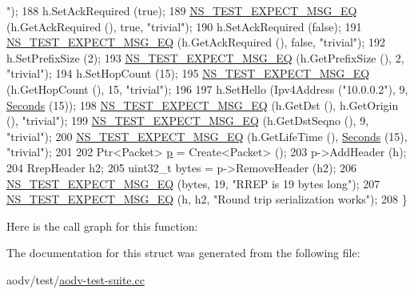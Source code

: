 \begin{DoxyCode}
{      "});
188     h.SetAckRequired (\textcolor{keyword}{true});
189     \hyperlink{group__testing_ga7304ba46a28d8cf08dfdfd6499cf7068}{NS\_TEST\_EXPECT\_MSG\_EQ} (h.GetAckRequired (), \textcolor{keyword}{true}, \textcolor{stringliteral}{"trivial"});
190     h.SetAckRequired (\textcolor{keyword}{false});
191     \hyperlink{group__testing_ga7304ba46a28d8cf08dfdfd6499cf7068}{NS\_TEST\_EXPECT\_MSG\_EQ} (h.GetAckRequired (), \textcolor{keyword}{false}, \textcolor{stringliteral}{"trivial"});
192     h.SetPrefixSize (2);
193     \hyperlink{group__testing_ga7304ba46a28d8cf08dfdfd6499cf7068}{NS\_TEST\_EXPECT\_MSG\_EQ} (h.GetPrefixSize (), 2, \textcolor{stringliteral}{"trivial"});
194     h.SetHopCount (15);
195     \hyperlink{group__testing_ga7304ba46a28d8cf08dfdfd6499cf7068}{NS\_TEST\_EXPECT\_MSG\_EQ} (h.GetHopCount (), 15, \textcolor{stringliteral}{"trivial"});
196 
197     h.SetHello (Ipv4Address (\textcolor{stringliteral}{"10.0.0.2"}), 9, \hyperlink{group__timecivil_ga33c34b816f8ff6628e33d5c8e9713b9e}{Seconds} (15));
198     \hyperlink{group__testing_ga7304ba46a28d8cf08dfdfd6499cf7068}{NS\_TEST\_EXPECT\_MSG\_EQ} (h.GetDst (), h.GetOrigin (), \textcolor{stringliteral}{"trivial"});
199     \hyperlink{group__testing_ga7304ba46a28d8cf08dfdfd6499cf7068}{NS\_TEST\_EXPECT\_MSG\_EQ} (h.GetDstSeqno (), 9, \textcolor{stringliteral}{"trivial"});
200     \hyperlink{group__testing_ga7304ba46a28d8cf08dfdfd6499cf7068}{NS\_TEST\_EXPECT\_MSG\_EQ} (h.GetLifeTime (), \hyperlink{group__timecivil_ga33c34b816f8ff6628e33d5c8e9713b9e}{Seconds} (15), \textcolor{stringliteral}{"trivial"});
201 
202     Ptr<Packet> \hyperlink{lte__link__budget_8m_ac9de518908a968428863f829398a4e62}{p} = Create<Packet> ();
203     p->AddHeader (h);
204     RrepHeader h2;
205     uint32\_t bytes = p->RemoveHeader (h2);
206     \hyperlink{group__testing_ga7304ba46a28d8cf08dfdfd6499cf7068}{NS\_TEST\_EXPECT\_MSG\_EQ} (bytes, 19, \textcolor{stringliteral}{"RREP is 19 bytes long"});
207     \hyperlink{group__testing_ga7304ba46a28d8cf08dfdfd6499cf7068}{NS\_TEST\_EXPECT\_MSG\_EQ} (h, h2, \textcolor{stringliteral}{"Round trip serialization works"});
208   \}
\end{DoxyCode}


Here is the call graph for this function\+:




The documentation for this struct was generated from the following file\+:\begin{DoxyCompactItemize}
\item 
aodv/test/\hyperlink{aodv-test-suite_8cc}{aodv-\/test-\/suite.\+cc}\end{DoxyCompactItemize}

